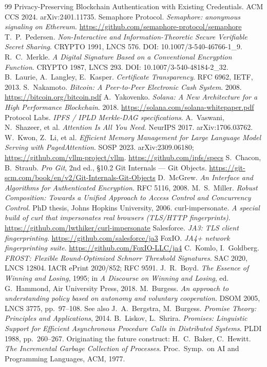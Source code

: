 \documentclass[11pt]{article}
\begin{document}
\begin{thebibliography}{99}
{Privacy-Preserving Blockchain Authentication with Existing Credentials}. ACM CCS
2024. arXiv:2401.11735.
 Semaphore Protocol. \emph{Semaphore: anonymous signaling on
Ethereum}. \url{https://github.com/semaphore-protocol/semaphore}
 T.~P.~Pedersen. \emph{Non-Interactive and
Information-Theoretic Secure Verifiable Secret Sharing}. CRYPTO 1991, LNCS 576.
DOI: 10.1007/3-540-46766-1\_9.
 R.~C.~Merkle. \emph{A Digital Signature Based on a Conventional
Encryption Function}. CRYPTO 1987, LNCS 293. DOI: 10.1007/3-540-48184-2\_32.
 B.~Laurie, A.~Langley, E.~Kasper. \emph{Certificate
Transparency}. RFC 6962, IETF, 2013.
 S.~Nakamoto. \emph{Bitcoin: A Peer-to-Peer Electronic Cash
System}. 2008. \url{https://bitcoin.org/bitcoin.pdf}
 A.~Yakovenko. \emph{Solana: A New Architecture for a High
Performance Blockchain}. 2018. \url{https://solana.com/solana-whitepaper.pdf}
 Protocol Labs. \emph{IPFS / IPLD Merkle-DAG specifications}.
 A.~Vaswani, N.~Shazeer, et al. \emph{Attention Is All You
Need}. NeurIPS 2017. arXiv:1706.03762.
 W.~Kwon, Z.~Li, et al. \emph{Efficient Memory Management
for Large Language Model Serving with PagedAttention}. SOSP 2023. arXiv:2309.06180;
\url{https://github.com/vllm-project/vllm}.
\url{https://github.com/ipfs/specs}
 S.~Chacon, B.~Straub. \emph{Pro Git}, 2nd ed., \S10.2 Git
Internals --- Git Objects. \url{https://git-scm.com/book/en/v2/Git-Internals-Git-Objects}
 D.~McGrew. \emph{An Interface and Algorithms for Authenticated
Encryption}. RFC 5116, 2008.
 M.~S.~Miller. \emph{Robust Composition: Towards a Unified Approach
to Access Control and Concurrency Control}. PhD thesis, Johns Hopkins University,
2006.
 curl-impersonate. \emph{A special build of curl that
impersonates real browsers (TLS/HTTP fingerprints)}.
\url{https://github.com/lwthiker/curl-impersonate}
 Salesforce. \emph{JA3: TLS client fingerprinting}.
\url{https://github.com/salesforce/ja3}
 FoxIO. \emph{JA4+ network fingerprinting suite}.
\url{https://github.com/FoxIO-LLC/ja4}
 C.~Komlo, I.~Goldberg. \emph{FROST: Flexible Round-Optimized
Schnorr Threshold Signatures}. SAC 2020, LNCS 12804. IACR ePrint 2020/852; RFC 9591.
 J.~R.~Boyd. \emph{The Essence of Winning and Losing}, 1995; in
\emph{A Discourse on Winning and Losing}, ed. G.~Hammond, Air University Press, 2018.
 M.~Burgess. \emph{An approach to understanding policy based on
autonomy and voluntary cooperation}. DSOM 2005, LNCS 3775, pp.~97--108. See also
J.~A.~Bergstra, M.~Burgess. \emph{Promise Theory: Principles and Applications}, 2014.
 B.~Liskov, L.~Shrira. \emph{Promises: Linguistic Support for Efficient
Asynchronous Procedure Calls in Distributed Systems}. PLDI 1988, pp.~260--267. Originating
the future construct: H.~C.~Baker, C.~Hewitt. \emph{The Incremental Garbage Collection of
Processes}. Proc.\ Symp.\ on AI and Programming Languages, ACM, 1977.
\end{thebibliography}
\end{document}
